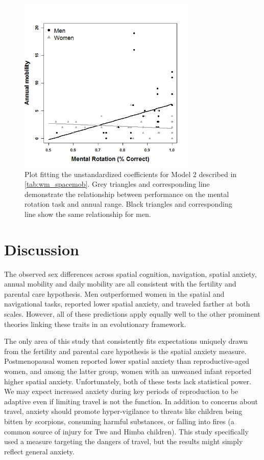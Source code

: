 \begin{figure}[!htb]
  \includegraphics[width=0.75\textwidth]{mw_acctot}
\caption{Plot fitting the unstandardized coefficients for Model 2 described in \ref{tab:wm_spacemob}. Grey triangles and corresponding line demonstrate the relationship between performance on the mental rotation task and annual range.  Black triangles and corresponding line show the same relationship for men.}
\label{fig:mw_acctot}       %
\end{figure}

\section{Discussion}
\label{sec:4}

The observed sex differences across spatial cognition, navigation, spatial anxiety, annual mobility and daily mobility are all consistent with the fertility and parental care hypothesis.  Men outperformed women in the spatial and navigational tasks, reported lower spatial anxiety, and traveled farther at both scales.  However, all of these predictions apply equally well to the other prominent theories linking these traits in an evolutionary framework.  

The only area of this study that consistently fits expectations uniquely drawn from the fertility and parental care hypothesis is the spatial anxiety measure.  Postmenopausal women reported lower spatial anxiety than reproductive-aged women, and among the latter group, women with an unweaned infant reported higher spatial anxiety.  Unfortunately, both of these tests lack statistical power.  We may expect increased anxiety during key periods of reproduction to be adaptive even if limiting travel is not the function.  In addition to concerns about travel, anxiety should promote hyper-vigilance to threats like children being bitten by scorpions, consuming harmful substances, or falling into fires (a common source of injury for Twe and Himba children).  This study specifically used a measure targeting the dangers of travel, but the results might simply reflect general anxiety.

